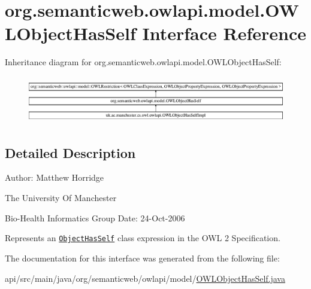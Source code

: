 \hypertarget{interfaceorg_1_1semanticweb_1_1owlapi_1_1model_1_1_o_w_l_object_has_self}{\section{org.\-semanticweb.\-owlapi.\-model.\-O\-W\-L\-Object\-Has\-Self Interface Reference}
\label{interfaceorg_1_1semanticweb_1_1owlapi_1_1model_1_1_o_w_l_object_has_self}
}
Inheritance diagram for org.\-semanticweb.\-owlapi.\-model.\-O\-W\-L\-Object\-Has\-Self\-:\begin{figure}[H]
\begin{center}
\leavevmode
\includegraphics[height=2.084367cm]{interfaceorg_1_1semanticweb_1_1owlapi_1_1model_1_1_o_w_l_object_has_self}
\end{center}
\end{figure}


\subsection{Detailed Description}
Author\-: Matthew Horridge\par
 The University Of Manchester\par
 Bio-\/\-Health Informatics Group Date\-: 24-\/\-Oct-\/2006 

Represents an \href{http://www.w3.org/TR/2009/REC-owl2-syntax-20091027/#Self-Restriction}{\tt Object\-Has\-Self} class expression in the O\-W\-L 2 Specification. 

The documentation for this interface was generated from the following file\-:\begin{DoxyCompactItemize}
\item 
api/src/main/java/org/semanticweb/owlapi/model/\hyperlink{_o_w_l_object_has_self_8java}{O\-W\-L\-Object\-Has\-Self.\-java}\end{DoxyCompactItemize}

